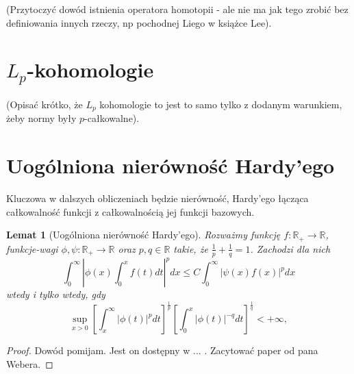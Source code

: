 \documentclass[licencjacka]{pracamgr}
\theoremstyle{definition}
\theoremstyle{definition}
\theoremstyle{plain}
\newtheorem{lemma}{Lemat}[section]
\theoremstyle{plain}
\begin{document}
(Przytoczyć dowód istnienia operatora homotopii - ale nie ma jak tego zrobić bez
definiowania innych rzeczy, np pochodnej Liego w książce Lee). \\


\section{$L_p$-kohomologie}
(Opisać krótko, że $L_p$ kohomologie to jest to samo tylko z dodanym warunkiem, 
żeby normy były $p$-całkowalne).


\section{Uogólniona nierówność Hardy'ego}
Kluczowa w dalszych obliczeniach będzie nierówność, Hardy'ego łącząca całkowalność
funkcji z całkowalnością jej funkcji bazowych.

\begin{lemma}[Uogólniona nierówność Hardy'ego]\label{hardy}
    Rozważmy funkcję $f: \mathbb{R}_{+} \rightarrow \mathbb{R}$, funkcje-wagi
    $\phi, \psi: \mathbb{R}_{+} \rightarrow \mathbb{R}$ oraz $p, q \in
    \mathbb{R}$ takie, że $\frac{1}{p} + \frac{1}{q} = 1 $.  Zachodzi dla nich
$$
\int_0^\infty \left|
                \phi(x) \int_0^x f(t) dt
              \right|^p dx
\leq
C \int_0^\infty \left|
                    \psi(x)  f(x)
                \right|^p dx
$$
wtedy i tylko wtedy, gdy
$$
\sup_{x > 0}
\left[
\int_x^\infty  
   | \phi(t) |^p dt
\right]^{\frac{1}{p}}
\left[
\int_0^x
    | \phi(t) |^{-q} dt
\right]^{\frac{1}{q}} < + \infty,
$$
\end{lemma}
\begin{proof}
    Dowód pomijam. 
    Jest on dostępny w ... . Zacytować paper od pana Webera.
\end{proof}
\end{document}
